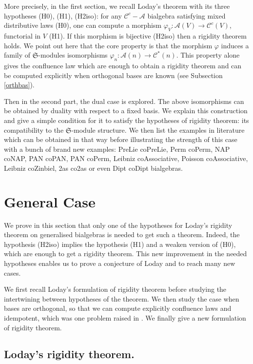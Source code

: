 \documentclass[11pt,leqno]{amsart}
\theoremstyle{definition}
\theoremstyle{plain}
\newcommand{\A}{ \mathcal{A} }
\newcommand{\C}{ \mathcal{C} }
\begin{document}
More precisely, in the first section, we recall Loday's theorem with its three hypotheses (H0), (H1), (H2iso): for any $\mathcal{C}^c-\mathcal{A}$ bialgebra satisfying mixed distributive laws (H0), one can compute a morphism $\varphi_V: \A(V) \rightarrow \C^c(V)$, functorial in $V$ (H1). If this morphism is bijective (H2iso) then a rigidity theorem holds. We point out here that the core property is that the morphism $\varphi$ induces a family of $\mathfrak{S}$-modules isomorphisms $\varphi_n :\mathcal{A}(n)\to\mathcal C^*(n) $. This property alone gives the confluence law which are enough to obtain a rigidity theorem and can be computed explicitly when orthogonal bases are known (see Subsection \ref{orthbas}).

Then in the second part, the dual case is explored. The above isomorphisms can be obtained by duality with respect to a fixed basis. We explain this construction and give a simple condition for it to satisfy the hypotheses of rigidity theorem: its compatibility to the $\mathfrak{S}$-module structure. We then list the examples in literature which can be obtained in that way before illustrating the strength of this case with a bunch of brand new examples: PreLie coPreLie, Perm coPerm, NAP coNAP, PAN coPAN, PAN coPerm, Leibniz coAssociative, Poisson coAssociative, Leibniz coZinbiel, 2as co2as or even Dipt coDipt bialgebras.



\section{General Case}
We prove in this section that only one of the hypotheses for Loday's rigidity theorem on generalised bialgebras is needed to get such a theorem. Indeed, the hypothesis (H2iso) implies the hypothesis (H1) and a weaken version of (H0), which are enough to get a rigidity theorem. This new improvement in the needed hypotheses enables us to prove a conjecture of Loday and to reach many new cases.
 
 We first recall Loday's formulation of rigidity theorem before studying the intertwining between hypotheses of the theorem. We then study the case when bases are orthogonal, so that we can compute explicitly confluence laws and idempotent, which was one problem raised in \cite{GBO}. We finally give a new formulation of rigidity theorem.
 
 
 \subsection{Loday's rigidity theorem.}
 
\end{document}
